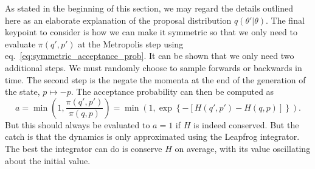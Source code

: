 As stated in the beginning of this section, we may regard the details outlined here as an elaborate explanation of the proposal distribution $q(\theta'|\theta)$. The final keypoint to consider is how we can make it symmetric so
that we only need to evaluate $\pi(q', p')$ at the Metropolis step using eq.~\eqref{eq:symmetric_acceptance_prob}. It can be shown that we only need two additional steps. We must randomly choose to sample forwards or backwards in time. The second step is the negate the momenta at the end of the generation of the state, $p \mapsto -p$. The acceptance probability can then be computed as
\begin{equation}
  a = \min \left(1, \frac{\pi(q', p')}{\pi(q, p)}\right) = \min \left(1, \exp\left\{-\left[H(q',p') - H(q, p)\right]\right\}\right).
\end{equation}
But this should always be evaluated to $a = 1$ if $H$ is indeed conserved. But the catch is that the dynamics is only approximated using the Leapfrog integrator. The best the integrator can do is conserve $H$ on average, with its value oscillating about the initial value.

